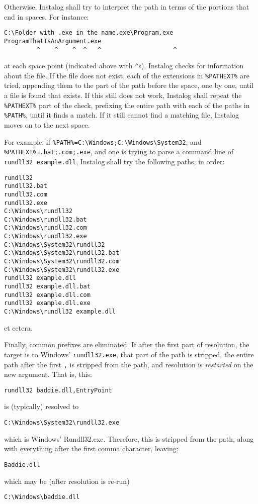 Otherwise, Instalog shall try to interpret the path in terms of the portions
that end in spaces. For instance:
\begin{verbatim}
C:\Folder with .exe in the name.exe\Program.exe ProgramThatIsAnArgument.exe
         ^    ^    ^  ^   ^                    ^
\end{verbatim}
at each space point (indicated above with \verb|^|s), Instalog checks for
information about the file. If the file does not exist, each of the extensions
in \verb|%PATHEXT%| are tried, appending them to the part of the path before the
space, one by one, until a file is found that exists. If this still does not
work, Instalog shall repeat the \verb|%PATHEXT%| part of the check, prefixing
the entire path with each of the paths in \verb|%PATH%|, until it finds a match.
If it still cannot find a matching file, Instalog moves on to the next space.

For example, if \verb|%PATH%=C:\Windows;C:\Windows\System32|, and
\verb|%PATHEXT%=.bat;.com;.exe|, and one is trying to parse a command line of
\verb|rundll32 example.dll|, Instalog shall try the following paths, in
order:
\begin{verbatim}
rundll32
rundll32.bat
rundll32.com
rundll32.exe
C:\Windows\rundll32
C:\Windows\rundll32.bat
C:\Windows\rundll32.com
C:\Windows\rundll32.exe
C:\Windows\System32\rundll32
C:\Windows\System32\rundll32.bat
C:\Windows\System32\rundll32.com
C:\Windows\System32\rundll32.exe
rundll32 example.dll
rundll32 example.dll.bat
rundll32 example.dll.com
rundll32 example.dll.exe
C:\Windows\rundll32 example.dll
\end{verbatim}
et cetera.

Finally, common prefixes are eliminated. If after the first part of resolution,
the target is to Windows' \verb|rundll32.exe|, that part of the path is
stripped, the entire path after the first \verb|,| is stripped from the path,
and resolution is \textit{restarted} on the new argument. That is, this:
\begin{verbatim}
rundll32 baddie.dll,EntryPoint
\end{verbatim}
is (typically) resolved to
\begin{verbatim}
C:\Windows\System32\rundll32.exe
\end{verbatim}
which is Windows' Rundll32.exe. Therefore, this is stripped from the path, along
with everything after the first comma character, leaving:
\begin{verbatim}
Baddie.dll
\end{verbatim}
which may be (after resolution is re-run)
\begin{verbatim}
C:\Windows\baddie.dll
\end{verbatim}


